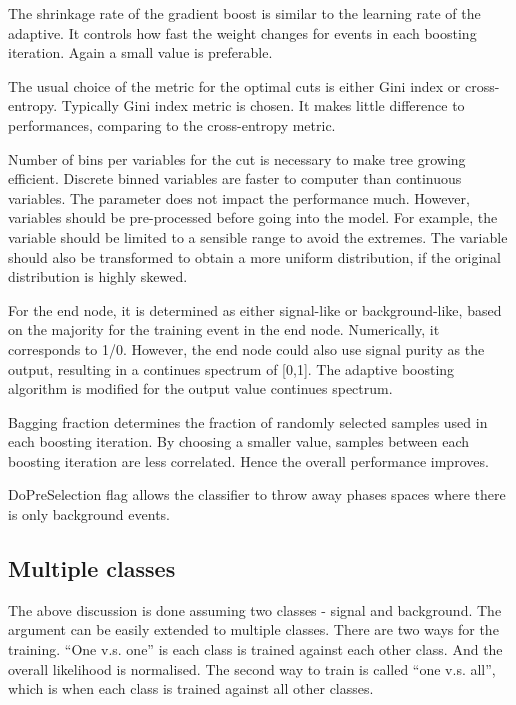 The shrinkage rate of the gradient boost is similar to the learning rate of the adaptive. It controls how fast the weight changes for events in each boosting iteration. Again a small value is preferable.

The usual choice of the metric for the optimal cuts is either Gini index or cross-entropy. Typically Gini index metric is chosen. It makes little difference to performances, comparing to the cross-entropy metric.

Number of bins per variables for the cut is necessary to make tree growing efficient. Discrete binned variables are faster to computer than continuous variables. The parameter does not impact the performance much. However, variables should be pre-processed before going into the model. For example, the variable should be limited to a sensible range to avoid the extremes. The variable should also be transformed to obtain a more uniform distribution, if the original distribution is highly skewed.

For the end node, it is determined as either signal-like or background-like, based on the majority for the training event in the end node. Numerically, it corresponds to 1/0. However, the end node could also use signal purity as the output, resulting in a continues spectrum of [0,1]. The adaptive boosting algorithm is modified for the output value continues spectrum.

Bagging fraction determines the fraction of randomly selected samples used in each boosting iteration. By choosing a smaller value, samples between each boosting iteration are less correlated. Hence the overall performance improves.

DoPreSelection flag allows the classifier to throw away phases spaces where there is only background events.

\subsection{Multiple classes}
\label{sec:pandoraMVAmulticlass}

The above discussion is done assuming two classes - signal and background. The argument can be easily extended to multiple classes. There are two ways for the training. ``One v.s. one'' is each class is trained against each other class. And the overall likelihood is normalised. The second way to train is called ``one v.s. all'', which is when each class is trained against all other classes.


